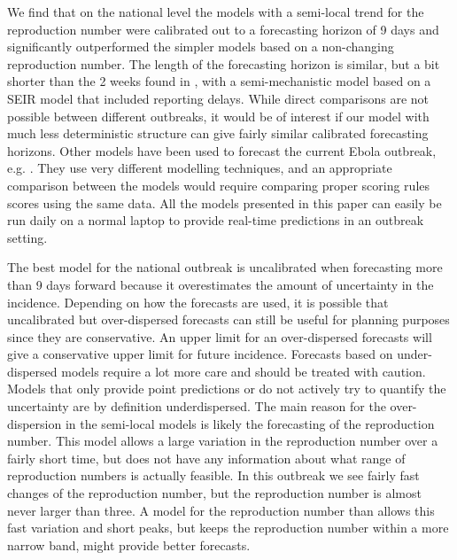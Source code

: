 \documentclass[12pt]{article}
\begin{document}
We find that on the national level the models with a semi-local trend for the reproduction number were calibrated out to a forecasting horizon of 9 days and significantly outperformed the simpler models based on a non-changing reproduction number. The length of the forecasting horizon is similar, but a bit shorter than the 2 weeks found in \cite{funkAssessingPerformanceRealtime2019}, with a semi-mechanistic model based on a SEIR model that included reporting delays. While direct comparisons are not possible between different outbreaks, it would be of interest if our model with much less deterministic structure can give fairly similar calibrated forecasting horizons. Other models have been used to forecast the current Ebola outbreak, e.g. \cite{kellyRealtimePredictions201820192019, akhmetzhanovAnalyzingForecastingEbola2019}. They use very different modelling techniques, and an appropriate comparison between the models would require comparing proper scoring rules scores using the same data. All the models presented in this paper can easily be run daily on a normal laptop to provide real-time predictions in an outbreak setting. 


The best model for the national outbreak is uncalibrated when forecasting more than 9 days forward because it overestimates the amount of uncertainty in the incidence. Depending on how the forecasts are used, it is possible that uncalibrated but over-dispersed forecasts can still be useful for planning purposes since they are conservative. An upper limit for an over-dispersed forecasts will give a conservative upper limit for future incidence. Forecasts based on under-dispersed models require a lot more care and should be treated with caution. Models that only provide point predictions or do not actively try to quantify the uncertainty are by definition underdispersed. The main reason for the over-dispersion in the semi-local models is likely the forecasting of the reproduction number. This model allows a large variation in the reproduction number over a fairly short time, but does not have any information about what range of reproduction numbers is actually feasible. In this outbreak we see fairly fast changes of the reproduction number, but the reproduction number is almost never larger than three. A model for the reproduction number than allows this fast variation and short peaks, but keeps the reproduction number within a more narrow band, might provide better forecasts.
\end{document}

